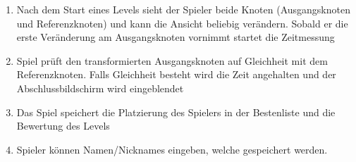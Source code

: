 \begin{enumerate}
\item Nach dem Start eines Levels sieht der Spieler beide Knoten (Ausgangsknoten und Referenzknoten) und kann die Ansicht beliebig verändern. Sobald er die erste Veränderung am Ausgangsknoten vornimmt startet die Zeitmessung
\item Spiel prüft den transformierten Ausgangsknoten auf Gleichheit mit dem Referenzknoten. Falls Gleichheit besteht wird die Zeit angehalten und der Abschlussbildschirm wird eingeblendet
\item Das Spiel speichert die Platzierung des Spielers in der Bestenliste und die Bewertung des Levels
\item Spieler können Namen/Nicknames eingeben, welche gespeichert werden.

\end{enumerate}

	
